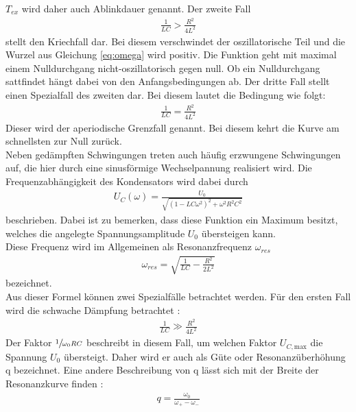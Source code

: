 $T_{ex}$ wird daher auch Ablinkdauer genannt.
\justify
Der zweite Fall \cite{V354}
\begin{align}
    \frac{1}{LC} >\frac{R^2}{4L^2} \label{eq:Fall2}
\end{align}
stellt den Kriechfall dar. Bei diesem verschwindet der oszillatorische Teil und
die Wurzel aus Gleichung \eqref{eq:omega} wird positiv.
Die Funktion geht mit maximal einem Nulldurchgang nicht-oszillatorisch gegen null.
Ob ein Nulldurchgang sattfindet hängt dabei von den Anfangsbedingungen ab.
\newpage
\justify
Der dritte Fall stellt einen Spezialfall des zweiten dar.
Bei diesem lautet die Bedingung \cite{V354} wie folgt:
\begin{align}
    \frac{1}{LC} = \frac{R^2}{4L^2} \label{eq:Fall3}
\end{align}
Dieser wird der aperiodische Grenzfall genannt. Bei diesem kehrt die Kurve
am schnellsten zur Null zurück.\\
Neben gedämpften Schwingungen treten auch häufig erzwungene Schwingungen auf,
die hier durch eine sinusförmige Wechselpannung realisiert wird. 
Die Frequenzabhängigkeit des Kondensators wird dabei durch 
\begin{align}
    U_C (\omega)=\frac{U_0}{\sqrt{(1-LC\omega ^2)^2+\omega ^2 R^2 C^2}} \label{eq:9}
\end{align}
beschrieben.
Dabei ist zu bemerken, dass diese Funktion ein Maximum besitzt, welches die
angelegte Spannungsamplitude $U_0$ übersteigen kann.\\
Diese Frequenz wird im Allgemeinen als Resonanzfrequenz $\omega_{res}$ \cite{V354} 
\begin{align}
    \omega_{res} = \sqrt{\frac{1}{LC}-\frac{R^2}{2L^2}} \label{eq:omegares}
\end{align}
bezeichnet.\\
Aus dieser Formel können zwei Spezialfälle betrachtet werden.
Für den ersten Fall wird die schwache Dämpfung betrachtet \cite{V354}:
\begin{align}
    \frac{1}{LC} \gg \frac{R^2}{4L^2} \label{eq:Fall1b}
\end{align}
Der Faktor $\sfrac{1}{\omega _0 RC}$ beschreibt in diesem Fall, um welchen Faktor 
$U_{C,\text{max}}$ die Spannung $U_0$ übersteigt. Daher wird er auch als Güte 
oder Resonanzüberhöhung q bezeichnet.
Eine andere Beschreibung von q lässt sich mit der Breite der 
Resonanzkurve finden \cite{V354}:
\begin{align}
    q = \frac{\omega _0}{\omega _+ - \omega _-} \label{eq:guete}
\end{align}
